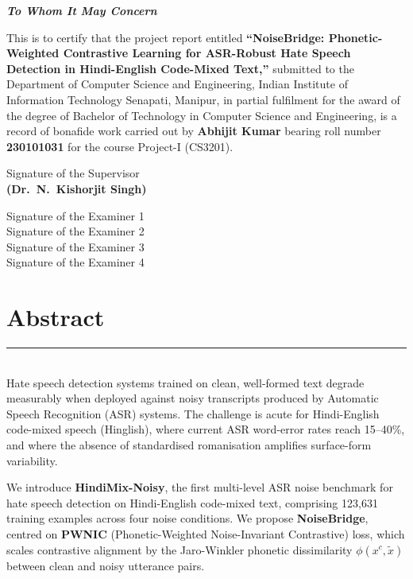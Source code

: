 \documentclass[12pt,a4paper]{report}
\begin{document}
\vspace{30pt}
\begin{center}
  {\Large\bfseries\itshape To Whom It May Concern}
\end{center}
\vspace{16pt}

This is to certify that the project report entitled \textbf{``NoiseBridge: Phonetic-Weighted Contrastive Learning for ASR-Robust Hate Speech Detection in Hindi-English Code-Mixed Text,''} submitted to the Department of Computer Science and Engineering, Indian Institute of Information Technology Senapati, Manipur, in partial fulfilment for the award of the degree of Bachelor of Technology in Computer Science and Engineering, is a record of bonafide work carried out by \textbf{Abhijit Kumar} bearing roll number \textbf{230101031} for the course Project-I (CS3201).

\vspace{50pt}
\begin{flushright}
  Signature of the Supervisor\\[6pt]
  \textbf{(Dr.\ N.\ Kishorjit Singh)}
\end{flushright}

\vspace{30pt}
Signature of the Examiner 1 \enspace \dotfill\\[10pt]
Signature of the Examiner 2 \enspace \dotfill\\[10pt]
Signature of the Examiner 3 \enspace \dotfill\\[10pt]
Signature of the Examiner 4 \enspace \dotfill
\clearpage

\chapter*{Abstract}
\rule{\textwidth}{0.6pt}\\[6pt]
Hate speech detection systems trained on clean, well-formed text degrade measurably when deployed against noisy transcripts produced by Automatic Speech Recognition (ASR) systems. The challenge is acute for Hindi-English code-mixed speech (Hinglish), where current ASR word-error rates reach 15--40\%, and where the absence of standardised romanisation amplifies surface-form variability.

We introduce \textbf{HindiMix-Noisy}, the first multi-level ASR noise benchmark for hate speech detection on Hindi-English code-mixed text, comprising 123,631 training examples across four noise conditions. We propose \textbf{NoiseBridge}, centred on \textbf{PWNIC} (Phonetic-Weighted Noise-Invariant Contrastive) loss, which scales contrastive alignment by the Jaro-Winkler phonetic dissimilarity $\phi(x^c, \tilde{x})$ between clean and noisy utterance pairs.
\end{document}

